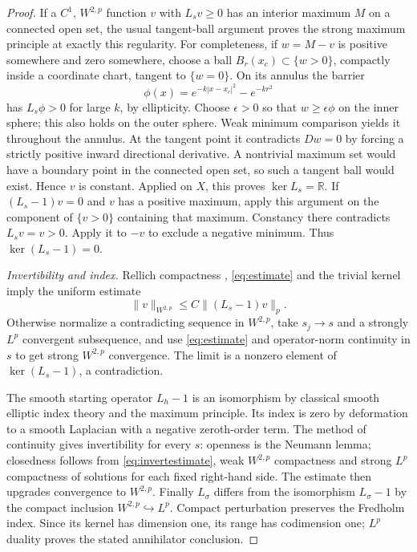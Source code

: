 \documentclass[11pt]{article}
\theoremstyle{remark}
\begin{document}
\begin{proof}
If a $C^1$, $W^{2,p}$ function $v$ with $L_sv\geq0$ has an interior
maximum $M$ on a connected open set, the usual tangent-ball argument
proves the strong maximum principle at exactly this regularity.
For completeness, if $w=M-v$ is positive somewhere and zero somewhere,
choose a ball $B_r(x_c)\subset\{w>0\}$, compactly inside a coordinate
chart, tangent to $\{w=0\}$. On its annulus the barrier
\[
 \phi(x)=e^{-k|x-x_c|^2}-e^{-kr^2}
\]
has $L_s\phi>0$ for large $k$, by ellipticity. Choose $\epsilon>0$
so that $w\geq\epsilon\phi$ on the inner sphere; this also holds on
the outer sphere. Weak minimum comparison yields it throughout the
annulus. At the tangent point it contradicts $Dw=0$ by forcing a strictly
positive inward directional derivative. A nontrivial maximum set would
have a boundary point in the connected open set, so such a tangent ball
would exist. Hence $v$ is constant. Applied on $X$, this proves
$\ker L_s=\mathbb R$. If $(L_s-1)v=0$ and $v$ has a positive maximum,
apply this argument on the component of $\{v>0\}$ containing that
maximum. Constancy there contradicts $L_sv=v>0$. Apply it to $-v$
to exclude a negative minimum. Thus $\ker(L_s-1)=0$.

\emph{Invertibility and index.}
Rellich compactness \cite[Chapter 13, Proposition 6.9]{Taylor},
\eqref{eq:estimate} and the trivial kernel imply the uniform estimate
\begin{equation}\label{eq:invertestimate}
 \|v\|_{W^{2,p}}\leq C\|(L_s-1)v\|_p.
\end{equation}
Otherwise normalize a contradicting sequence in $W^{2,p}$, take
$s_j\to s$ and a strongly $L^p$ convergent subsequence, and use
\eqref{eq:estimate} and operator-norm continuity in $s$ to get strong
$W^{2,p}$ convergence. The limit is a nonzero element of
$\ker(L_s-1)$, a contradiction.

The smooth starting operator $L_h-1$ is an isomorphism by classical
smooth elliptic index theory and the maximum principle. Its index is
zero by deformation to a smooth Laplacian with a negative zeroth-order
term. The method of continuity gives invertibility for every $s$:
openness is the Neumann lemma; closedness follows from
\eqref{eq:invertestimate}, weak $W^{2,p}$ compactness and strong $L^p$
compactness of solutions for each fixed right-hand side. The estimate
then upgrades convergence to $W^{2,p}$.
Finally $L_\sigma$ differs from the isomorphism $L_\sigma-1$ by the
compact inclusion $W^{2,p}\hookrightarrow L^p$. Compact perturbation
preserves the Fredholm index. Since its kernel has dimension one,
its range has codimension one; $L^p$ duality proves the stated
annihilator conclusion.
\end{proof}
\end{document}
